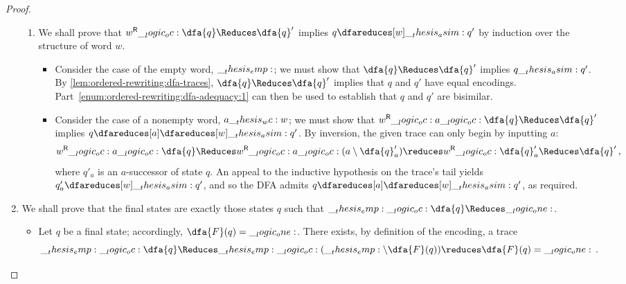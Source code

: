 \begin{proof}
\begin{enumerate}[parsep=0em, listparindent=\parindent]
\begin{enumerate}
    \item
      We shall prove that $\rev{w} \oc \dfa{q} \Reduces \dfa{q}'$ implies $q \dfareduces[w]\asim q'$ by induction over the structure of word $w$.
      \begin{itemize}
      \item
        Consider the case of the empty word, $\__thesis_emp:$;
        we must show that $\dfa{q} \Reduces \dfa{q}'$ implies $q \__thesis_asim: q'$.
        By \cref{lem:ordered-rewriting:dfa-traces}, $\dfa{q} \Reduces \dfa{q}'$ implies that $q$ and $q'$ have equal encodings.
        Part~\ref{enum:ordered-rewriting:dfa-adequacy:1} can then be used to establish that $q$ and $q'$ are bisimilar.
      \item
        Consider the case of a nonempty word, $a \wc w$;
        we must show that $\rev{w} \oc a \oc \dfa{q} \Reduces \dfa{q}'$ implies $q \dfareduces[a]\dfareduces[w]\asim q'$.
        By inversion, the given trace can only begin by inputting $a$:
        \begin{equation*}
          \rev{w} \oc a \oc \dfa{q}
            \Reduces \rev{w} \oc a \oc (a \limp \dfa{q}'_a)
            \reduces \rev{w} \oc \dfa{q}'_a
            \Reduces \dfa{q}'
          \,,
        \end{equation*}
        where $q'_a$ is an $a$-successor of state $q$.
        An appeal to the inductive hypothesis on the trace's tail yields $q'_a \dfareduces[w]\asim q'$, and so the \ac{DFA} admits $q \dfareduces[a]\dfareduces[w]\asim q'$, as required.
      \end{itemize}
    \end{enumerate}

  \item
    We shall prove that the final states are exactly those states $q$ such that $\emp \oc \dfa{q} \Reduces \one$.
    \begin{itemize}
    \item
      Let $q$ be a final state; accordingly, $\dfa{F}(q) = \one$.
      There exists, by definition of the encoding, a trace
      \begin{equation*}
        \emp \oc \dfa{q} \Reduces \emp \oc (\emp \limp \dfa{F}(q)) \reduces \dfa{F}(q) = \one
      \,.
      \end{equation*}


\end{itemize}
\end{enumerate}
\end{proof}
